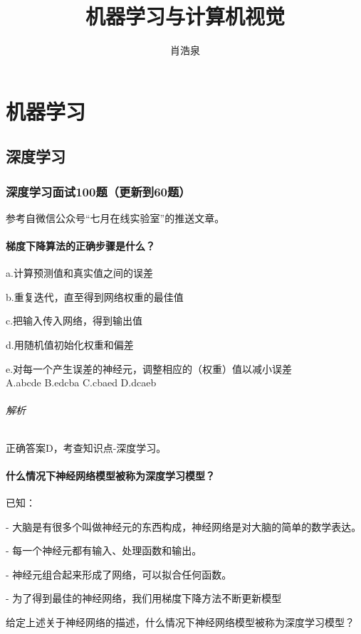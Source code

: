 \documentclass[UTF8]{ctexbook}
\begin{document}
\title{机器学习与计算机视觉}
\author{ 肖浩泉}
\maketitle

\tableofcontents

\part{机器学习}
\chapter{深度学习}
\section{深度学习面试100题（更新到60题）}
参考自微信公众号“七月在线实验室”的推送文章。
\subsection{梯度下降算法的正确步骤是什么？}
a.计算预测值和真实值之间的误差  

b.重复迭代，直至得到网络权重的最佳值  

c.把输入传入网络，得到输出值  

d.用随机值初始化权重和偏差  

e.对每一个产生误差的神经元，调整相应的（权重）值以减小误差  
\\  

A.abcde    B.edcba     C.cbaed      D.dcaeb

\paragraph{解析}正确答案D，考查知识点-深度学习。


\subsection{什么情况下神经网络模型被称为深度学习模型？}
已知：  

- 大脑是有很多个叫做神经元的东西构成，神经网络是对大脑的简单的数学表达。

- 每一个神经元都有输入、处理函数和输出。

- 神经元组合起来形成了网络，可以拟合任何函数。

- 为了得到最佳的神经网络，我们用梯度下降方法不断更新模型

给定上述关于神经网络的描述，什么情况下神经网络模型被称为深度学习模型？
\end{document}
